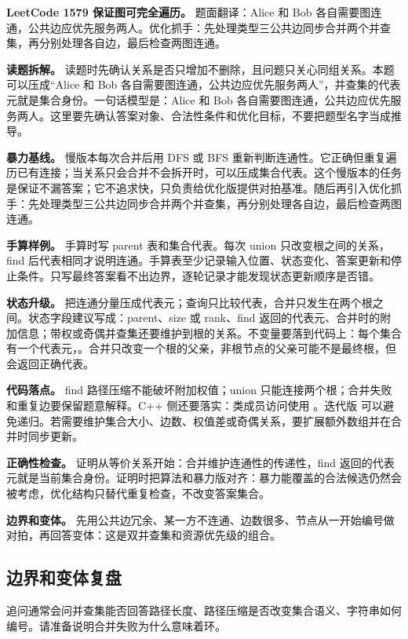 \noindent\textbf{LeetCode 1579 保证图可完全遍历。} 题面翻译：Alice 和 Bob 各自需要图连通，公共边应优先服务两人。优化抓手：先处理类型三公共边同步合并两个并查集，再分别处理各自边，最后检查两图连通。

\textbf{读题拆解。} 读题时先确认关系是否只增加不删除，且问题只关心同组关系。本题可以压成“Alice 和 Bob 各自需要图连通，公共边应优先服务两人”，并查集的代表元就是集合身份。一句话模型是：Alice 和 Bob 各自需要图连通，公共边应优先服务两人。这里要先确认答案对象、合法性条件和优化目标，不要把题型名字当成推导。

\textbf{暴力基线。} 慢版本每次合并后用 DFS 或 BFS 重新判断连通性。它正确但重复遍历已有连接；当关系只会合并不会拆开时，可以压成集合代表。这个慢版本的任务是保证不漏答案；它不追求快，只负责给优化版提供对拍基准。随后再引入优化抓手：先处理类型三公共边同步合并两个并查集，再分别处理各自边，最后检查两图连通。

\textbf{手算样例。} 手算时写 parent 表和集合代表。每次 union 只改变根之间的关系，find 后代表相同才说明连通。手算表至少记录输入位置、状态变化、答案更新和停止条件。只写最终答案看不出边界，逐轮记录才能发现状态更新顺序是否错。

\textbf{状态升级。} 把连通分量压成代表元；查询只比较代表，合并只发生在两个根之间。状态字段建议写成：parent、size 或 rank、find 返回的代表元、合并时的附加信息；带权或奇偶并查集还要维护到根的关系。不变量要落到代码上：每个集合有一个代表元，。合并只改变一个根的父亲，非根节点的父亲可能不是最终根，但  会返回正确代表。

\textbf{代码落点。} find 路径压缩不能破坏附加权值；union 只能连接两个根；合并失败和重复边要保留题意解释。C++ 侧还要落实：类成员访问使用 。迭代版  可以避免递归。若需要维护集合大小、边数、权值差或奇偶关系，要扩展额外数组并在合并时同步更新。

\textbf{正确性检查。} 证明从等价关系开始：合并维护连通性的传递性，find 返回的代表元就是当前集合身份。证明时把算法和暴力版对齐：暴力能覆盖的合法候选仍然会被考虑，优化结构只替代重复检查，不改变答案集合。

\textbf{边界和变体。} 先用公共边冗余、某一方不连通、边数很多、节点从一开始编号做对拍，再回答变体：这是双并查集和资源优先级的组合。

\subsection{边界和变体复盘}

追问通常会问并查集能否回答路径长度、路径压缩是否改变集合语义、字符串如何编号。请准备说明合并失败为什么意味着环。


